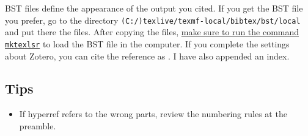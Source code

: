 \documentclass[a4paper,pdftex]{article}
\begin{document}
BST files define the appearance of the output you cited. If you get the BST file you prefer, go to the directory \texttt{(C:/)texlive/texmf-local/bibtex/bst/local} and put there the files. After copying the files, \uline{make sure to run the command \texttt{mktexlsr}} to load the BST file in the computer. If you complete the settings about Zotero, you can cite the reference as \cite[AGT]{Alday_LiouvilleCorrelation_2010}. I have also appended an index.

\subsection{Tips}

\begin{itemize}
  \item 
  If hyperref refers to the wrong parts, review the numbering rules at the preamble. 




\end{itemize}


\clearpage



\clearpage
\printindex
\end{document}
